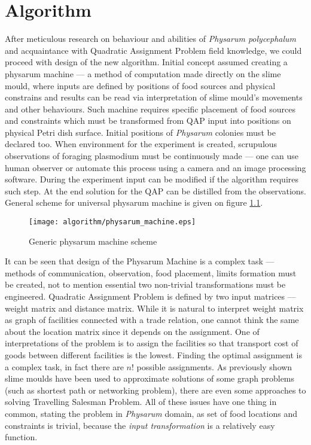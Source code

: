 \chapter{Algorithm}
\label{chapter:algorithm}

After meticulous research on behaviour and abilities of \textit{Physarum polycephalum} and acquaintance with Quadratic Assignment Problem field knowledge, we could proceed with design of the new algorithm. Initial concept assumed creating a physarum machine --- a method of computation made directly on the slime mould, where inputs are defined by positions of food sources and physical constrains and results can be read via interpretation of slime mould's movements and other behaviours. Such machine requires specific placement of food sources and constraints which must be transformed from QAP input into positions on physical Petri dish surface. Initial positions of \textit{Physarum} colonies must be declared too. When environment for the experiment is created, scrupulous observations of foraging plasmodium must be continuously made --- one can use human observer or automate this process using a camera and an image processing software. During the experiment input can be modified if the algorithm requires such step. At the end solution for the QAP can be distilled from the observations. General scheme for universal physarum machine is given on figure \ref{figure:a_machine}.

\begin{figure}
  \centering
  \texttt{[image: algorithm/physarum\_machine.eps]}
  \caption{Generic physarum machine scheme}
  \label{figure:a_machine}
\end{figure}

It can be seen that design of the Physarum Machine is a complex task --- methods of communication, observation, food placement, limits formation must be created, not to mention essential two non-trivial transformations must be engineered. Quadratic Assignment Problem is defined by two input matrices --- weight matrix and distance matrix. While it is natural to interpret weight matrix as graph of facilities connected with a trade relation, one cannot think the same about the location matrix since it depends on the assignment. One of interpretations of the problem is to assign the facilities so that transport cost of goods between different facilities is the lowest. Finding the optimal assignment is a complex task, in fact there are $n!$ possible assignments. As previously shown slime moulds have been used to approximate solutions of some graph problems (such as shortest path or networking problem), there are even some approaches to solving Travelling Salesman Problem. All of these issues have one thing in common, stating the problem in \textit{Physarum} domain, as set of food locations and constraints is trivial, because the \textit{input transformation} is a relatively easy function. 


